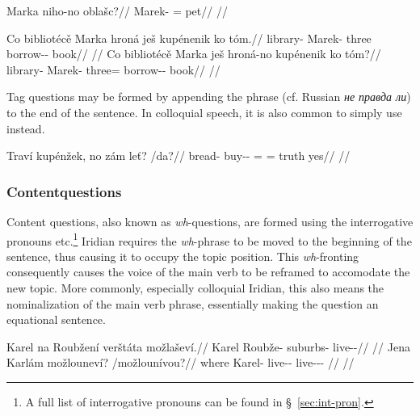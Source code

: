 \pex
\begingl
\gla Marka niho-no oblašc?//
\glb Marek-\Acc{} \N{}\Exst{}=\Q{} pet//
\glft {}//
\endgl
\xe

\pex
\a
\begingl
\gla Co bibliotécě Marka hroná ješ kupénenik ko tóm.//
\glb \Abl{} library-\Gen{} Marek-\Acc{} three \Exst{} borrow-\Pv{}-\Pf{} \Lnk{} book//
\glft {}//
\endgl
\a
\begingl
\gla Co bibliotécě Marka ješ hroná-no kupénenik ko tóm?//
\glb \Abl{} library-\Gen{} Marek-\Acc{} \Exst{} three=\Q{} borrow-\Pv{}-\Pf{} \Lnk{} book//
\glft {}//
\endgl
\xe

Tag questions may be formed by appending the phrase  (cf. Russian \textit{\cyrtext не
правда ли}) to the end of the sentence. In colloquial speech, it is also common
to simply use  instead.

\pex
\begingl
\gla Traví kupénžek, no zám le\v{t}? /da?//
\glb bread-\Gen{} buy-\Av{}-\Pf{} \Q{}= \Neg{}= truth yes//
\glft {}//
\endgl
\xe

\subsubsection{Contentquestions}\label{sec:content-questions}

Content questions, also known as \emph{wh}-questions, are formed using the
interrogative pronouns   
etc.\footnote{ A full list of interrogative pronouns can be found in
\S~\ref{sec:int-pron}. } Iridian requires the \emph{wh}-phrase to be moved to
the beginning of the sentence, thus causing it to occupy the topic position.
This \emph{wh}-fronting consequently
causes the voice of the main verb to be reframed to accomodate the new topic.
More commonly, especially colloquial Iridian, this
also means the nominalization of the main verb phrase,
essentially making the question an equational sentence.

\pex
\a\begingl
\gla Karel na Roubžení verštáta možlaševí.//
\glb Karel \Loc{} Roubže-\Gen{} suburbs-\Acc{} live-\Av{}-\Cont{}//
\glft {}//
\endgl
\a\begingl
\gla Jena Karlám možlouneví? /možlounívou?//
\glb where Karel-\Agt{} live-\Lv{}-\Cont{} live-\Lv{}-\Cont{}-\Nz{} //
\glft {}//
\endgl
\xe

